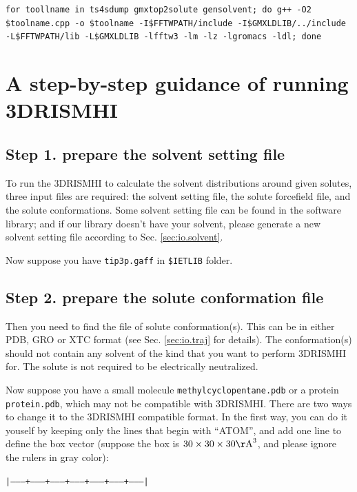 \documentclass[aip,amsmath,amssymb,reprint,onecolumn]{revtex4-1}
\begin{document}
\texttt{\small\color{blue}for toollname in ts4sdump gmxtop2solute gensolvent; do g++ -O2 \$toolname.cpp -o \$toolname -I\$FFTWPATH/include -I\$GMXLDLIB/../include -L\$FFTWPATH/lib -L\$GMXLDLIB -lfftw3 -lm -lz -lgromacs -ldl; done}



\section{A step-by-step guidance of running 3DRISMHI}

\subsection*{Step 1. prepare the solvent setting file}

To run the 3DRISMHI to calculate the solvent distributions around given solutes, three input files are required: the solvent setting file, the solute forcefield file, and the solute conformations. Some solvent setting file can be found in the software library; and if our library doesn't have your solvent, please generate a new solvent setting file according to Sec. \ref{sec:io.solvent}.

Now suppose you have \texttt{tip3p.gaff} in \texttt{\$IETLIB} folder.

\subsection*{Step 2. prepare the solute conformation file}

Then you need to find the file of solute conformation(s). This can be in either PDB, GRO or XTC format (see Sec. \ref{sec:io.traj} for details). The conformation(s) should not contain any solvent of the kind that you want to perform 3DRISMHI for. The solute is not required to be electrically neutralized.

Now suppose you have a small molecule \texttt{methylcyclopentane.pdb} or a protein \texttt{protein.pdb}, which may not be compatible with 3DRISMHI. There are two ways to change it to the 3DRISMHI compatible format. In the first way, you can do it youself by keeping only the lines that begin with ``ATOM'', and add one line to define the box vector (suppose the box is $30\times 30\times 30 {\rm\AA}^3$, and please ignore the rulers in gray color):

\texttt{\color[rgb]{0.7,0.7,0.7}\small |--------+---------+---------+---------+---------+---------+---------|}
\end{document}
